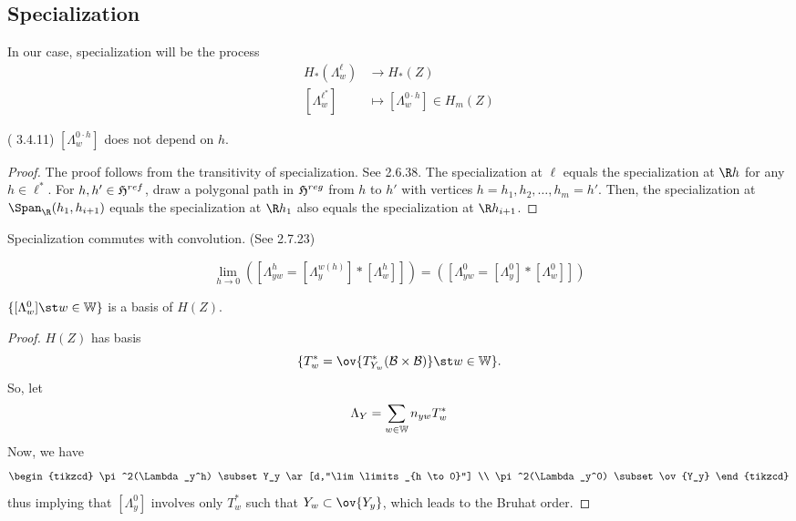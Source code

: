 \subsection{Specialization}
In our case, specialization will be the process 
\begin{align*}
  H_*(\Lambda_w^\ell) & \to H_*(Z) \\
  [\Lambda_w^{\ell^*}] & \mapsto [\Lambda_w^{0 \cdot h}] \in H_m(Z)
\end{align*}
\begin{lem}
  (\cite{cg} 3.4.11) \([\Lambda_w^{0 \cdot h}]\) does not depend on \(h\).
\end{lem}
\begin{proof}
  The proof follows from the transitivity of specialization. See
  \cite{cg} 2.6.38. The specialization at \(\ell\) equals the
  specialization at \(\R h\) for any \(h \in \ell^*\). For \(h,h' \in
  \mathfrak{H}^{ref}\), draw a polygonal path in \(\mathfrak{H}^{reg}\) from \(h\) to
  \(h'\) with vertices \(h = h_1, h_2, \ldots, h_m = h'\). Then, the
  specialization at \(\Span_\R(h_1,h_{i+1})\) equals the
  specialization at \(\R h_1\) also equals the specialization at \(\R
   h_{i+1}\).
\end{proof}
\begin{lem}
  Specialization commutes with convolution. (See \cite{cg} 2.7.23)
\end{lem}
\begin{lem}
  \[
    \lim_{h \to 0}([\Lambda_{yw}^h = [\Lambda_y^{w(h)}] *
    [\Lambda_w^h]]) = ([\Lambda_{yw}^0 = [\Lambda_y^0] * [\Lambda_w^0]])
  \]
\end{lem}
\begin{prop}
  \(\{[\Lambda_w^0] \st w \in \W\}\) is a basis of \(H(Z)\).
\end{prop}
\begin{proof}
  \(H(Z)\) has basis \[
    \{T_w^* = \ov{T_{Y_w}^*(\cB \times \cB)} \st w \in \W\}.
  \]
  So, let \[
    \Lambda_Y = \sum_{w \in \mathbb{W}} n_{yw} T_w^*
  \]
  Now, we have \[
    \begin{tikzcd}
      \pi^2(\Lambda_y^h) \subset Y_y \ar[d,"\lim\limits_{h \to 0}"] \\
      \pi^2(\Lambda_y^0) \subset \ov{Y_y}
    \end{tikzcd}
  \]
  thus implying that \([\Lambda_y^0]\) involves only \(T_w^*\) such
  that \(Y_w \subset \ov{Y_y}\), which leads to the Bruhat
  order. 
\end{proof}
